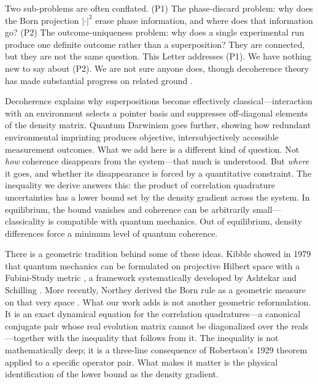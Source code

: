\documentclass[aps,prd,reprint,superscriptaddress,twocolumn]{revtex4-2}
\begin{document}
Two sub-problems are often conflated. (P1) The phase-discard problem: why does the Born projection $|\cdot|^2$ erase phase information, and where does that information go? (P2) The outcome-uniqueness problem: why does a single experimental run produce one definite outcome rather than a superposition? They are connected, but they are not the same question. This Letter addresses (P1). We have nothing new to say about (P2). We are not sure anyone does, though decoherence theory has made substantial progress on related ground \cite{Zurek2003,Zurek2009,JoosZeh1985}.

Decoherence explains why superpositions become effectively classical---interaction with an environment selects a pointer basis and suppresses off-diagonal elements of the density matrix. Quantum Darwinism \cite{Zurek2009} goes further, showing how redundant environmental imprinting produces objective, intersubjectively accessible measurement outcomes. What we add here is a different kind of question. Not \textit{how} coherence disappears from the system---that much is understood. But \textit{where} it goes, and whether its disappearance is forced by a quantitative constraint. The inequality we derive answers this: the product of correlation quadrature uncertainties has a lower bound set by the density gradient across the system. In equilibrium, the bound vanishes and coherence can be arbitrarily small---classicality is compatible with quantum mechanics. Out of equilibrium, density differences force a minimum level of quantum coherence.

There is a geometric tradition behind some of these ideas. Kibble showed in 1979 that quantum mechanics can be formulated on projective Hilbert space with a Fubini-Study metric \cite{Kibble1979}, a framework systematically developed by Ashtekar and Schilling \cite{AshtekarSchilling1999}. More recently, Northey derived the Born rule as a geometric measure on that very space \cite{Northey2025}. What our work adds is not another geometric reformulation. It is an exact dynamical equation for the correlation quadratures---a canonical conjugate pair whose real evolution matrix cannot be diagonalized over the reals---together with the inequality that follows from it. The inequality is not mathematically deep; it is a three-line consequence of Robertson's 1929 theorem applied to a specific operator pair. What makes it matter is the physical identification of the lower bound as the density gradient.
\end{document}
